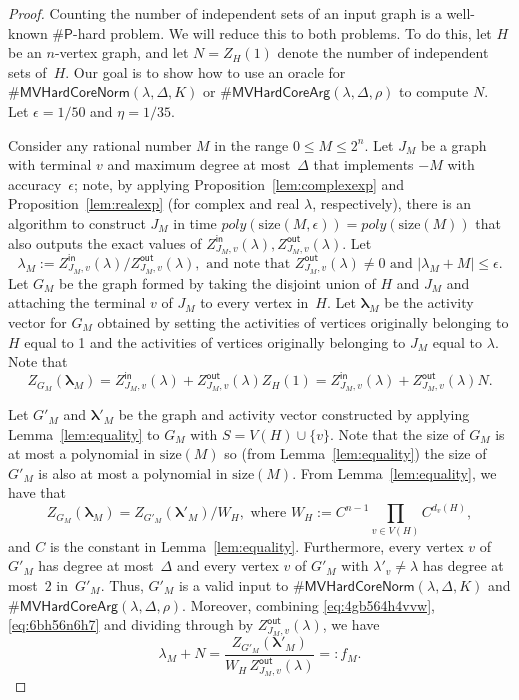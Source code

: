 \documentclass[11pt]{article}
\def\numP{\#\mathsf{P}}
\def\Zin{Z^{\mathsf{in}}}
\def\Zout{Z^{\mathsf{out}}}
\newcommand{\size}[1]{\mathrm{size}(#1)}
\def\lambdab{\ensuremath{\boldsymbol{\lambda}}}
\def\FactorMVHardCore#1{\#\ensuremath{\mathsf{MVHardCoreNorm}(\lambda,\Delta,#1)}}
\def\ArgMVHardCore#1{\#\ensuremath{\mathsf{MVHardCoreArg}(\lambda,\Delta,#1)}}
\begin{document}
\begin{proof}
Counting  the number of independent sets of an input graph is a well-known $\numP$-hard problem. We will reduce this to both problems. To do this, let $H$ be  an $n$-vertex graph, and let $N=Z_{H}(1)$ denote the number of independent sets of~$H$. Our goal is to 
show how to use an oracle for 
$\FactorMVHardCore{K}$
or
$\ArgMVHardCore{\rho}$ to
compute $N$. Let $\epsilon = 1/50$ and $\eta = 1/35$.    


 Consider any   rational number $M$ in the range $ 0 \leq M \leq 2^n$.
Let $J_M$ be a graph with terminal $v$ 
and maximum degree at most~$\Delta$
that implements $-M$ with accuracy~$\epsilon$; note, by applying Proposition~\ref{lem:complexexp} and Proposition~\ref{lem:realexp} (for complex and real $\lambda$, respectively), there is an algorithm to construct $J_M$ in time $poly(\size{M,\epsilon})=poly(\size{M})$ that also outputs the exact values of $\Zin_{J_M,v}(\lambda),\Zout_{J_M,v}(\lambda)$. Let
\begin{equation}\label{eq:searchtwo}
\lambda_M := {\Zin_{J_M,v}(\lambda)}/{\Zout_{J_M,v}(\lambda)}, \mbox{ and note that } \Zout_{J_M,v}(\lambda)\neq 0 \mbox{ and } |\lambda_M+M|\leq \epsilon.
\end{equation}
Let $G_M$ be the graph 
formed by taking the disjoint union of $H$ and $J_M$ and
attaching the terminal $v$ of $J_M$ to every vertex in~$H$.
Let $\lambdab_M$ be the activity vector for $G_M$ obtained by setting the activities of vertices originally belonging to $H$ equal to 1 and the activities of vertices originally belonging to $J_M$ equal to $\lambda$.
Note that 
\begin{equation}\label{eq:4gb564h4vvw}
Z_{G_M}(\lambdab_M) = \Zin_{J_M,v}(\lambda) + \Zout_{J_M,v}(\lambda) Z_H(1)=\Zin_{J_M,v}(\lambda) + \Zout_{J_M,v}(\lambda) N.
\end{equation}


Let $G'_M$ and $\lambdab'_M$ be the graph 
and activity vector
constructed by applying Lemma~\ref{lem:equality} to $G_M$
with $S = V(H) \cup \{v\}$. 
Note that the size of $G_M$
is at most a polynomial in $\size{M}$ so
 (from Lemma~\ref{lem:equality})
 the size of $G'_M$ is also at most a polynomial in $\size{M}$.
From Lemma~\ref{lem:equality}, we have that
\begin{equation}\label{eq:6bh56n6h7}
Z_{G_M}(\lambdab_M) = Z_{G'_M}(\lambdab'_M)/W_H,\mbox{ where } W_H:=C^{n-1} 
\prod_{v\in V(H)} C^{d_v(H)},
\end{equation}
and $C$ is the constant in Lemma~\ref{lem:equality}.
Furthermore, every vertex $v$ 
of $G'_M$
has degree at most~$\Delta$ and every vertex $v$ of $G'_M$
with $\lambda'_v\neq \lambda$ has
degree at most~$2$ in~$G'_M$.
Thus, $G'_M$ is a valid input to 
 $\FactorMVHardCore{K}$ and $\ArgMVHardCore{\rho}$. Moreover, combining \eqref{eq:4gb564h4vvw},\eqref{eq:6bh56n6h7} and dividing through by $ \Zout_{J_M,v}(\lambda) $,
we have 
\begin{equation}
\label{eq:searchone}
\lambda_M +    N=\frac{Z_{G'_M}(\lambdab'_M)}{W_H\, \Zout_{J_M,v}(\lambda)}=:f_M.
\end{equation}
 

\end{proof}
\end{document}

